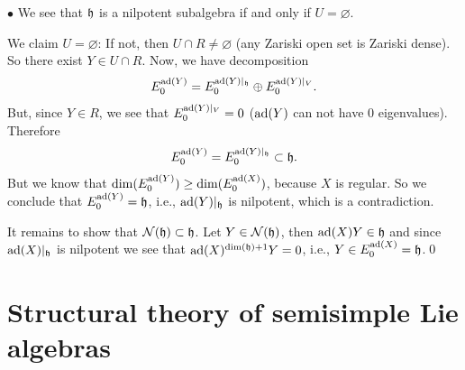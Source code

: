 \begin{dang}
    \begin{center}
      $\bullet $  We see that $\mathfrak{h}$ is a nilpotent subalgebra if and only if $U=\varnothing$.
    \end{center}
\end{dang}

We claim $U=\varnothing$: If not, then $U\cap R\neq\varnothing$ (any Zariski open set is Zariski dense).
So there exist $Y\in U\cap R$. Now, we have decomposition 
\begin{equation}
    E_0^{\text{ad}(Y)}=E_0^{\text{ad}(Y)|_{\mathfrak{h}}}\oplus E_0^{\text{ad}(Y)|_V}.
\end{equation}
But, since $Y\in R$, we see that $E_0^{\text{ad}(Y)|_V}=0$ ($\text{ad}(Y)$ can not have 0 eigenvalues). Therefore 
\begin{equation}
    E_0^{\text{ad}(Y)}=E_0^{\text{ad}(Y)|_{\mathfrak{h}}}\subset \mathfrak{h}.
\end{equation}
But we know that $\dim(E_0^{\text{ad}(Y)})\geq\dim(E_0^{\text{ad}(X)})$, because $X$ is regular. So we conclude that 
$E_0^{\text{ad}(Y)}=\mathfrak{h}$, i.e., $\text{ad}(Y)|_{\mathfrak{h}}$ is nilpotent, which is a contradiction.\par

It remains to show that $\mathcal{N}(\mathfrak{h})\subset \mathfrak{h}$. Let $Y\in \mathcal{N}(\mathfrak{h})$, then $\text{ad}(X)Y\in\mathfrak{h}$ and since 
$\text{ad}(X)|_{\mathfrak{h}}$ is nilpotent we see that $\text{ad}(X)^{\dim(\mathfrak{h})+1}Y=0$, i.e., $Y\in E_0^{\text{ad}(X)}=\mathfrak{h}$.\qed





\section{Structural theory of semisimple Lie algebras}
